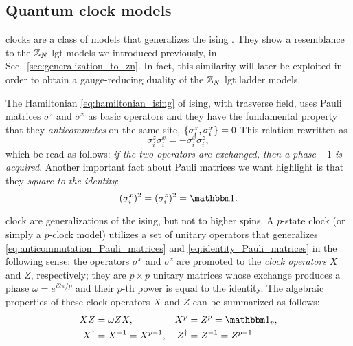 \subsection{Quantum clock models}%
\label{sub:clock_models}

\Acfp{clock} are a class of models that generalizes the \ac{ising} \cite{fendley2014parafermions, baxter1989clock}.
They show a resemblance to the $\mathbb{Z}_N$ \ac{lgt} models we introduced previously, in Sec.~\ref{sec:generalization_to_zn}.
In fact, this similarity will later be exploited in order to obtain a gauge-reducing duality of the $\mathbb{Z}_N$ \ac{lgt} ladder models.

The Hamiltonian \eqref{eq:hamiltonian_ising}  of \ac{ising}, with trasverse field, uses Pauli matrices $\sigma^z$ and $\sigma^x$ as basic operators and they have the fundamental property that they \emph{anticommutes} on the same site, $\acomm{\sigma^z_i}{\sigma^x_i} = 0$
This relation rewritten as
\begin{equation}
    \sigma^z_i \sigma^x_i = - \sigma^x_i \sigma^z_i,
    \label{eq:anticommutation_Pauli_matrices}
\end{equation}
which be read as follows: \emph{if the two operators are exchanged, then a phase $-1$ is acquired}.
Another important fact about Pauli matrices we want highlight is that they \emph{square to the identity}:
\begin{equation}
    (\sigma^x_i)^2 = (\sigma^z_i)^2 = \identity.
    \label{eq:identity_Pauli_matrices}
\end{equation}

\Ac{clock} are generalizations of the \ac{ising}, but not to higher spins.
A $p$-state \ac{clock} (or simply a $p$-clock model) utilizes a set of unitary operators that generalizes \eqref{eq:anticommutation_Pauli_matrices} and \eqref{eq:identity_Pauli_matrices} in the following sense:
the operators $\sigma^x$ and $\sigma^z$ are promoted to the \emph{clock operators} $X$ and $Z$, respectively;
they are $p \times p$ unitary matrices whose exchange produces a phase $\omega = e^{i 2 \pi / p}$ and their $p$-th power is equal to the identity.
The algebraic properties of these clock operators $X$ and $Z$ can be summarized as follows:
\begin{equation}
    \begin{aligned}
        X Z & = \omega Z X, &
        X^p & =  Z^p = \identity_p, \\
        X^\dagger & = X^{-1} = X^{p-1}, &
        Z^\dagger & = Z^{-1} = Z^{p-1}
    \end{aligned}
    \label{eq:clock_operator_algebra}
\end{equation}

